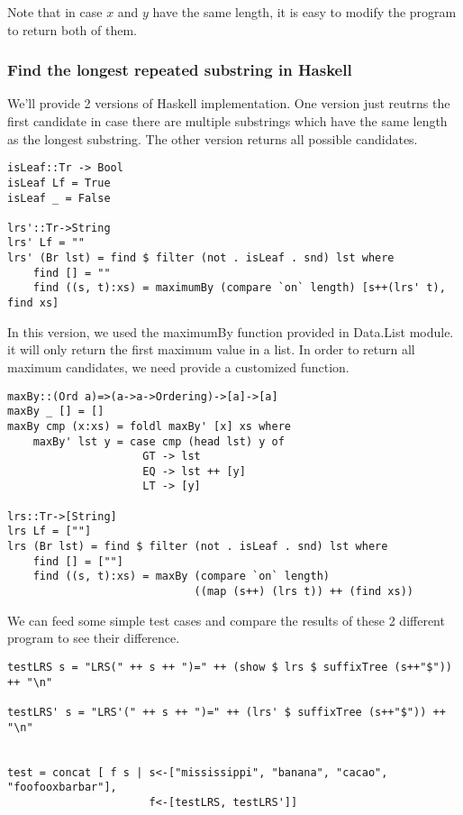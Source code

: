 \documentclass{article}
\begin{document}
Note that in case $x$ and $y$ have the same length, it is easy to
modify the program to return both of them.

\subsubsection*{Find the longest repeated substring in Haskell}
We'll provide 2 versions of Haskell implementation. One version
just reutrns the first candidate in case there are multiple substrings
which have the same length as the longest substring. The other
version returns all possible candidates.

\lstset{language=Haskell}
\begin{lstlisting}
isLeaf::Tr -> Bool
isLeaf Lf = True
isLeaf _ = False

lrs'::Tr->String
lrs' Lf = ""
lrs' (Br lst) = find $ filter (not . isLeaf . snd) lst where
    find [] = ""
    find ((s, t):xs) = maximumBy (compare `on` length) [s++(lrs' t), find xs]
\end{lstlisting} %

In this version, we used the maximumBy function provided in Data.List
module. it will only return the first maximum value in a list.
In order to return all maximum candidates, we need provide a customized
function.

\begin{lstlisting}
maxBy::(Ord a)=>(a->a->Ordering)->[a]->[a]
maxBy _ [] = []
maxBy cmp (x:xs) = foldl maxBy' [x] xs where
    maxBy' lst y = case cmp (head lst) y of
                     GT -> lst
                     EQ -> lst ++ [y]
                     LT -> [y]

lrs::Tr->[String]
lrs Lf = [""]
lrs (Br lst) = find $ filter (not . isLeaf . snd) lst where
    find [] = [""]
    find ((s, t):xs) = maxBy (compare `on` length) 
                             ((map (s++) (lrs t)) ++ (find xs))
\end{lstlisting} %

We can feed some simple test cases and compare the results of 
these 2 different program to see their difference.

\begin{lstlisting}
testLRS s = "LRS(" ++ s ++ ")=" ++ (show $ lrs $ suffixTree (s++"$")) ++ "\n"

testLRS' s = "LRS'(" ++ s ++ ")=" ++ (lrs' $ suffixTree (s++"$")) ++ "\n"


test = concat [ f s | s<-["mississippi", "banana", "cacao", "foofooxbarbar"],
                      f<-[testLRS, testLRS']]
\end{lstlisting} %
\end{document}
